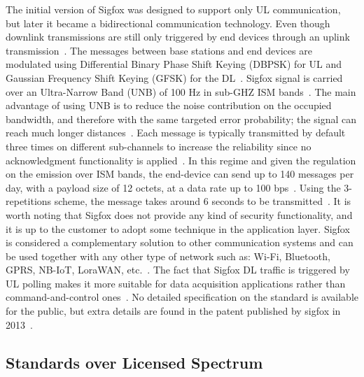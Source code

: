 \documentclass[]{IEEEtran}
\begin{document}
The initial version of Sigfox was designed to support only UL communication, but later it became a bidirectional communication technology.
Even though downlink transmissions are still only triggered by end devices through an uplink transmission~\cite{ding_iot_2020}.
The messages between base stations and end devices are modulated using Differential Binary Phase Shift Keying (DBPSK) for UL and Gaussian Frequency Shift Keying (GFSK) for the DL~\cite{kalfus2016ultra}.
Sigfox signal is carried over an Ultra-Narrow Band (UNB) of 100 Hz in sub-GHZ ISM bands~\cite{mekki2019comparative}.
The main advantage of using UNB is to reduce the noise contribution on the occupied bandwidth, and therefore with the same targeted error probability; the signal can reach much longer distances~\cite{do2014interference}.
Each message is typically transmitted by default three times on different sub-channels to increase the reliability since no acknowledgment functionality is applied~\cite{margelis2015low}.
In this regime and given the regulation on the emission over ISM bands, the end-device can send up to 140 messages per day, with a payload size of 12 octets, at a data rate up to 100 bps~\cite{augustin2016study}.
Using the 3-repetitions scheme, the message takes around 6 seconds to be transmitted~\cite{kalfus2016ultra}.
It is worth noting that Sigfox does not provide any kind of security functionality, and it is up to the customer to adopt some technique in the application layer\cite{margelis2015low}.
Sigfox is considered a complementary solution to other communication systems and can be used together with any other type of network such as:  Wi-Fi, Bluetooth, GPRS, NB-IoT, LoraWAN, etc.~\cite{noauthor_what_nodate}.
The fact that Sigfox DL traffic is triggered by UL polling makes it more suitable for data acquisition applications rather than command-and-control ones~\cite{augustin2016study}.
No detailed specification on the standard is available for the public, but extra details are found in the patent published by sigfox in 2013~\cite{vertesMethodTransmittingUseful2017}.

\subsection{Standards over Licensed Spectrum}
\label{sec:2-2}
\end{document}
